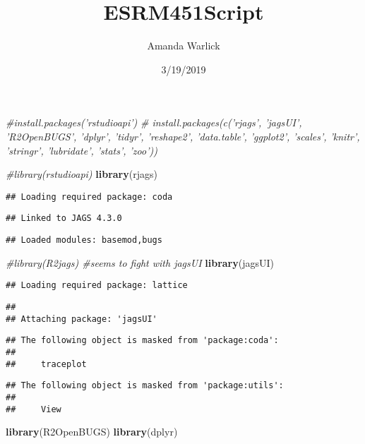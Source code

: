 \documentclass[]{article}
\title{ESRM451Script}
\author{Amanda Warlick}
\date{3/19/2019}
\newenvironment{Shaded}{\begin{snugshade}}{\end{snugshade}}
\newcommand{\KeywordTok}[1]{\textcolor[rgb]{0.13,0.29,0.53}{\textbf{#1}}}
\newcommand{\CommentTok}[1]{\textcolor[rgb]{0.56,0.35,0.01}{\textit{#1}}}
\newcommand{\NormalTok}[1]{#1}
\begin{document}
\maketitle

\begin{Shaded}
\begin{Highlighting}[]
\CommentTok{#install.packages('rstudioapi')}
\CommentTok{# install.packages(c('rjags', 'jagsUI', 'R2OpenBUGS', 'dplyr', 'tidyr', 'reshape2', 'data.table', 'ggplot2', 'scales', 'knitr', 'stringr', 'lubridate', 'stats', 'zoo'))}

\CommentTok{#library(rstudioapi)}
\KeywordTok{library}\NormalTok{(rjags)}
\end{Highlighting}
\end{Shaded}

\begin{verbatim}
## Loading required package: coda
\end{verbatim}

\begin{verbatim}
## Linked to JAGS 4.3.0
\end{verbatim}

\begin{verbatim}
## Loaded modules: basemod,bugs
\end{verbatim}

\begin{Shaded}
\begin{Highlighting}[]
\CommentTok{#library(R2jags) #seems to fight with jagsUI}
\KeywordTok{library}\NormalTok{(jagsUI)}
\end{Highlighting}
\end{Shaded}

\begin{verbatim}
## Loading required package: lattice
\end{verbatim}

\begin{verbatim}
## 
## Attaching package: 'jagsUI'
\end{verbatim}

\begin{verbatim}
## The following object is masked from 'package:coda':
## 
##     traceplot
\end{verbatim}

\begin{verbatim}
## The following object is masked from 'package:utils':
## 
##     View
\end{verbatim}

\begin{Shaded}
\begin{Highlighting}[]
\KeywordTok{library}\NormalTok{(R2OpenBUGS)}
\KeywordTok{library}\NormalTok{(dplyr)}
\end{Highlighting}
\end{Shaded}
\end{document}
